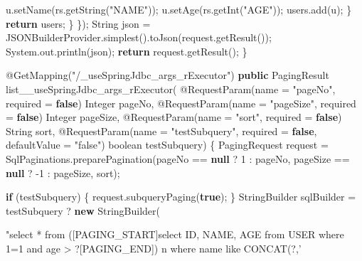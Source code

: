 \documentclass[
]{book}
\newenvironment{Shaded}{\begin{snugshade}}{\end{snugshade}}
\newcommand{\AttributeTok}[1]{\textcolor[rgb]{0.77,0.63,0.00}{#1}}
\newcommand{\BuiltInTok}[1]{#1}
\newcommand{\DataTypeTok}[1]{\textcolor[rgb]{0.13,0.29,0.53}{#1}}
\newcommand{\DecValTok}[1]{\textcolor[rgb]{0.00,0.00,0.81}{#1}}
\newcommand{\FunctionTok}[1]{\textcolor[rgb]{0.00,0.00,0.00}{#1}}
\newcommand{\KeywordTok}[1]{\textcolor[rgb]{0.13,0.29,0.53}{\textbf{#1}}}
\newcommand{\NormalTok}[1]{#1}
\newcommand{\StringTok}[1]{\textcolor[rgb]{0.31,0.60,0.02}{#1}}
\begin{document}
\begin{Shaded}
\begin{Highlighting}[]
{\NormalTok{                    u.}\FunctionTok{setName}\NormalTok{(rs.}\FunctionTok{getString}\NormalTok{(}\StringTok{"NAME"}\NormalTok{));}
\NormalTok{                    u.}\FunctionTok{setAge}\NormalTok{(rs.}\FunctionTok{getInt}\NormalTok{(}\StringTok{"AGE"}\NormalTok{));}
\NormalTok{                    users.}\FunctionTok{add}\NormalTok{(u);}
\NormalTok{                \}}
                \KeywordTok{return}\NormalTok{ users;}
\NormalTok{            \}}
\NormalTok{        \});}
        \BuiltInTok{String}\NormalTok{ json = JSONBuilderProvider.}\FunctionTok{simplest}\NormalTok{().}\FunctionTok{toJson}\NormalTok{(request.}\FunctionTok{getResult}\NormalTok{());}
        \BuiltInTok{System}\NormalTok{.}\FunctionTok{out}\NormalTok{.}\FunctionTok{println}\NormalTok{(json);}
        \KeywordTok{return}\NormalTok{ request.}\FunctionTok{getResult}\NormalTok{();}
\NormalTok{    \}}

    \AttributeTok{@GetMapping}\NormalTok{(}\StringTok{"/_useSpringJdbc_args_rExecutor"}\NormalTok{)}
    \KeywordTok{public}\NormalTok{ PagingResult }\FunctionTok{list__useSpringJdbc_args_rExecutor}\NormalTok{(}
            \AttributeTok{@RequestParam}\NormalTok{(name = }\StringTok{"pageNo"}\NormalTok{, required = }\KeywordTok{false}\NormalTok{) }\BuiltInTok{Integer}\NormalTok{ pageNo,}
            \AttributeTok{@RequestParam}\NormalTok{(name = }\StringTok{"pageSize"}\NormalTok{, required = }\KeywordTok{false}\NormalTok{) }\BuiltInTok{Integer}\NormalTok{ pageSize,}
            \AttributeTok{@RequestParam}\NormalTok{(name = }\StringTok{"sort"}\NormalTok{, required = }\KeywordTok{false}\NormalTok{) }\BuiltInTok{String}\NormalTok{ sort,}
            \AttributeTok{@RequestParam}\NormalTok{(name = }\StringTok{"testSubquery"}\NormalTok{, required = }\KeywordTok{false}\NormalTok{, defaultValue = }\StringTok{"false"}\NormalTok{) }\DataTypeTok{boolean}\NormalTok{ testSubquery) \{}
\NormalTok{        PagingRequest request = SqlPaginations.}\FunctionTok{preparePagination}\NormalTok{(pageNo == }\KeywordTok{null}\NormalTok{ ? }\DecValTok{1}\NormalTok{ : pageNo, pageSize == }\KeywordTok{null}\NormalTok{ ? -}\DecValTok{1}\NormalTok{ : pageSize, sort);}

        \KeywordTok{if}\NormalTok{ (testSubquery) \{}
\NormalTok{            request.}\FunctionTok{subqueryPaging}\NormalTok{(}\KeywordTok{true}\NormalTok{);}
\NormalTok{        \}}
        \BuiltInTok{StringBuilder}\NormalTok{ sqlBuilder = testSubquery ? }\KeywordTok{new} \BuiltInTok{StringBuilder}\NormalTok{(}\StringTok{"select * from ([PAGING_START]select ID, NAME, AGE from USER where 1=1 and age > ?[PAGING_END]) n where name like CONCAT(?,'%') "}\NormalTok{) : }\KeywordTok{new} \BuiltInTok{StringBuilder}\NormalTok{(}\StringTok{"select ID, NAME, AGE from USER where 1=1 and age > ?"}\NormalTok{);}

}}
\end{Highlighting}
\end{Shaded}
\end{document}
